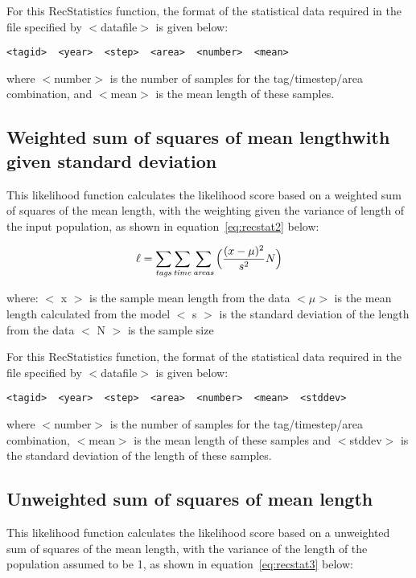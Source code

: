\documentclass [a4paper, 10pt]{book}
\begin{document}
\bigskip
For this RecStatistics function, the format of the statistical data required in the file specified by $<$datafile$>$ is given below:

{\small\begin{verbatim}
<tagid>  <year>  <step>  <area>  <number>  <mean>
\end{verbatim}}

where $<$number$>$ is the number of samples for the tag/timestep/area combination, and $<$mean$>$ is the mean length of these samples.

\subsection{Weighted sum of squares of mean length\newline with given standard deviation}
This likelihood function calculates the likelihood score based on a weighted sum of squares of the mean length, with the weighting given the variance of length of the input population, as shown in  equation~\ref{eq:recstat2} below:

\begin{equation}\label{eq:recstat2}
\ell = \sum_{\it tags}\sum_{\it time}\sum_{\it areas} \Big(\frac{(x-\mu)^2} {s^2} N\Big)
\end{equation}

where:\newline
$<$ x $>$ is the sample mean length from the data\newline
$<\mu>$ is the mean length calculated from the model\newline
$<$ s $>$ is the standard deviation of the length from the data\newline
$<$ N $>$ is the sample size

\bigskip
For this RecStatistics function, the format of the statistical data required in the file specified by $<$datafile$>$ is given below:

{\small\begin{verbatim}
<tagid>  <year>  <step>  <area>  <number>  <mean>  <stddev>
\end{verbatim}}

where $<$number$>$ is the number of samples for the tag/timestep/area combination, $<$mean$>$ is the mean length of these samples and $<$stddev$>$ is the standard deviation of the length of these samples.

\subsection{Unweighted sum of squares of mean length}
This likelihood function calculates the likelihood score based on a unweighted sum of squares of the mean length, with the variance of the length of the population assumed to be 1, as shown in equation~\ref{eq:recstat3} below:
\end{document}
